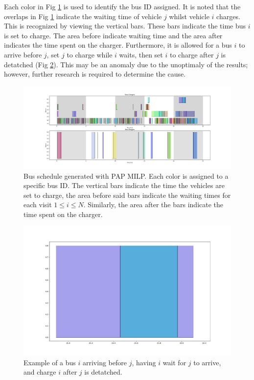 \documentclass[letterpaper, 10pt, conference]{IEEEtran}
\begin{document}
Each color in Fig \ref{fig:schedule} is used to identify the bus ID assigned. It is noted that the overlaps in Fig \ref{fig:schedule} indicate the waiting time of vehicle \(j\) whilst vehicle \(i\) charges. This is recognized by viewing the vertical bars. These bars indicate the time bus \(i\) is set to charge. The area before indicate waiting time and the area after indicates the time spent on the charger. Furthermore, it is allowed for a bus \(i\) to arrive before \(j\), set \(j\) to charge while \(i\) waits, then set \(i\) to charge after \(j\) is detatched (Fig \ref{fig:unoptimal}). This may be an anomaly due to the unoptimaly of the results; however, further research is required to determine the cause.

\begin{figure}[ht]
	\centering
	\includegraphics[trim=3in 0in 3in 0in, width=\linewidth]{schedule.pdf}
	\caption{Bus schedule generated with PAP MILP. Each color is assigned to a specific bus ID. The vertical bars indicate the time the vehicles are set to charge, the area before said bars indicate the waiting times for each visit \(1 \leq i \leq N\). Similarly, the area after the bars indicate the time spent on the charger.}
	\label{fig:schedule}
\end{figure}

\begin{figure}[ht]
	\centering
	\includegraphics[trim=0in 0in 0in 0in, width=\linewidth]{unoptimal.pdf}
	\caption{Example of a bus \(i\) arriving before \(j\), having \(i\) wait for \(j\) to arrive, and charge \(i\) after \(j\) is detatched.}
	\label{fig:unoptimal}
\end{figure}
\end{document}
